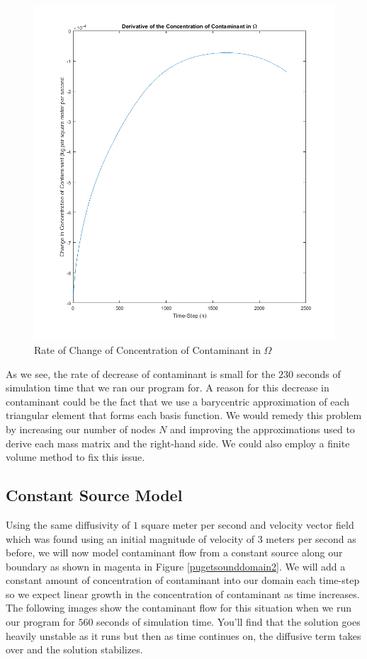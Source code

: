\documentclass[a4paper]{article}
\theoremstyle{remark}
\theoremstyle{remark}
\begin{document}
\begin{figure}[H]   
\centering   
   \includegraphics[trim=0mm 0mm 0mm 0mm,clip,width=0.5\linewidth]{derivconservation.png}
    \caption{Rate of Change of Concentration of Contaminant in $\Omega$}
    \label{derivcons}
\end{figure}

As we see, the rate of decrease of contaminant is small for the $230$ seconds of simulation time that we ran our program for. A reason for this decrease in contaminant could be the fact that we use a barycentric approximation of each triangular element that forms each basis function. We would remedy this problem by increasing our number of nodes $N$ and improving the approximations used to derive each mass matrix and the right-hand side. We could also employ a finite volume method to fix this issue.
\subsection{Constant Source Model} \label{ConstantSourceModelSection}
Using the same diffusivity of $1$ square meter per second and velocity vector field which was found using an initial magnitude of velocity of $3$ meters per second as before, we will now model contaminant flow from a constant source along our boundary as shown in magenta in Figure \ref{pugetsounddomain2}. We will add a constant amount of concentration of contaminant into our domain each time-step so we expect linear growth in the concentration of contaminant as time increases. The following images show the contaminant flow for this situation when we run our program for $560$ seconds of simulation time. You'll find that the solution goes heavily unstable as it runs but then as time continues on, the diffusive term takes over and the solution stabilizes.
\end{document}

